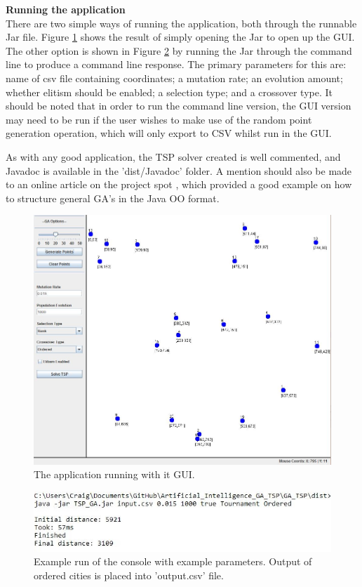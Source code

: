 \documentclass[article]{IEEEtran}
\begin{document}
\appendix

\textbf{Running the application}\\
\label{running}
There are two simple ways of running the application, both through the runnable Jar file. Figure \ref{fig:6} shows the result of simply opening the Jar to open up the GUI. The other option is shown in Figure \ref{fig:7} by running the Jar through the command line to produce a command line response. The primary parameters for this are: name of csv file containing coordinates; a mutation rate; an evolution amount; whether elitism should be enabled; a selection type; and a crossover type. It should be noted that in order to run the command line version, the GUI version may need to be run if the user wishes to make use of the random point generation operation, which will only export to CSV whilst run in the GUI. \par
As with any good application, the TSP solver created is well commented, and Javadoc is available in the 'dist/Javadoc' folder. A mention should also be made to an online article on the project spot \cite{13}, which provided a good example on how to structure general GA's in the Java OO format.

\begin{figure}[H]
\centering
\includegraphics[width=.8\linewidth]{images/GUI}
\caption{The application running with it GUI.}
\label{fig:6}
\end{figure}

\begin{figure}[H]
\centering
\includegraphics[width=.9\linewidth]{images/commandLine}
\caption{Example run of the console with example parameters. Output of ordered cities is placed into 'output.csv' file.}
\label{fig:7}
\end{figure}
\end{document}
